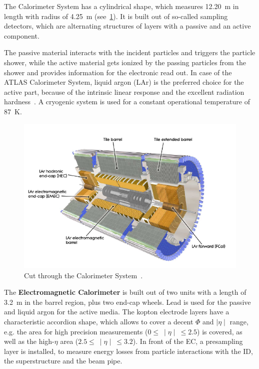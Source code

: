The Calorimeter System has a  cylindrical shape, which measures 12.20~m in length with radius of 4.25~m (see~\cref{fig:35}). It is built out of so-called sampling detectors, which are alternating structures of layers with a passive and an active component.

 The passive material interacts with the incident particles and triggers the particle shower, while the active material gets ionized by the passing particles from the shower and provides information for the electronic read out. In case of the ATLAS Calorimeter System, liquid argon (LAr) is the preferred choice for the active part, because of the intrinsic linear response and the excellent radiation hardness~\cite{Aad:2008zzm}. A cryogenic system is used for a constant operational temperature of 87~K.


\begin{figure}[h]
	\centering
	\includegraphics[width=0.65\linewidth]{Pics/cp3/35}
	\caption{Cut through the Calorimeter  System~\cite{Aad:2008zzm}.} 
	\label{fig:35}
	\end{figure}



 The \textbf{Electromagnetic Calorimeter} is built out of two units with a length of 3.2~m in the barrel region, plus two end-cap wheels. Lead is used for the passive and liquid argon for the active media. The kopton electrode layers have a characteristic accordion shape, which allows to cover a decent $\Phi$  and $\mid\eta\mid$ range, e.g. the area for high precision measurements  ($0 \leq~  \mid\eta\mid ~\leq 2.5$) is covered, as well as the high-$\eta$ area  ($2.5 \leq~ \mid\eta\mid~ \leq3.2$). In front of the EC, a presampling layer is installed, to measure energy losses  from particle interactions with the ID, the superstructure and the beam pipe.




